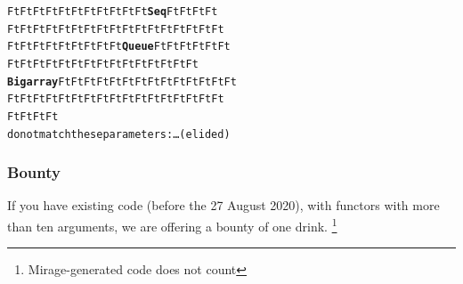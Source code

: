 \documentclass[11pt,aspectratio=169]{beamer}
\begin{document}
\begin{frame}[fragile]
\begin{alltt}
  {\color{green}{}Ft} {\color{green}{}Ft} {\color{green}{}Ft} {\color{green}{}Ft} {\color{green}{}Ft} {\color{green}{}Ft} {\color{green}{}Ft} {\color{green}{}Ft} {\color{green}{}Ft} {\color{green}{}Ft} {\color{green}{}Ft} {\color{red}{}\bfseries{}Seq} {\color{green}{}Ft} {\color{green}{}Ft} {\color{green}{}Ft} {\color{green}{}Ft}
  {\color{green}{}Ft} {\color{green}{}Ft} {\color{green}{}Ft} {\color{green}{}Ft} {\color{green}{}Ft} {\color{green}{}Ft} {\color{green}{}Ft} {\color{green}{}Ft} {\color{green}{}Ft} {\color{green}{}Ft} {\color{green}{}Ft} {\color{green}{}Ft} {\color{green}{}Ft} {\color{green}{}Ft} {\color{green}{}Ft} {\color{green}{}Ft} {\color{green}{}Ft}
  {\color{green}{}Ft} {\color{green}{}Ft} {\color{green}{}Ft} {\color{green}{}Ft} {\color{green}{}Ft} {\color{green}{}Ft} {\color{green}{}Ft} {\color{green}{}Ft} {\color{green}{}Ft} {\color{red}{}\bfseries{}Queue} {\color{green}{}Ft} {\color{green}{}Ft} {\color{green}{}Ft} {\color{green}{}Ft} {\color{green}{}Ft} {\color{green}{}Ft}
  {\color{green}{}Ft} {\color{green}{}Ft} {\color{green}{}Ft} {\color{green}{}Ft} {\color{green}{}Ft} {\color{green}{}Ft} {\color{green}{}Ft} {\color{green}{}Ft} {\color{green}{}Ft} {\color{green}{}Ft} {\color{green}{}Ft} {\color{green}{}Ft} {\color{green}{}Ft} {\color{green}{}Ft} {\color{green}{}Ft}
  {\color{red}{}\bfseries{}Bigarray} {\color{green}{}Ft} {\color{green}{}Ft} {\color{green}{}Ft} {\color{green}{}Ft} {\color{green}{}Ft} {\color{green}{}Ft} {\color{green}{}Ft} {\color{green}{}Ft} {\color{green}{}Ft} {\color{green}{}Ft} {\color{green}{}Ft} {\color{green}{}Ft} {\color{green}{}Ft} {\color{green}{}Ft}
  {\color{green}{}Ft} {\color{green}{}Ft} {\color{green}{}Ft} {\color{green}{}Ft} {\color{green}{}Ft} {\color{green}{}Ft} {\color{green}{}Ft} {\color{green}{}Ft} {\color{green}{}Ft} {\color{green}{}Ft} {\color{green}{}Ft} {\color{green}{}Ft} {\color{green}{}Ft} {\color{green}{}Ft} {\color{green}{}Ft} {\color{green}{}Ft} {\color{green}{}Ft}
  {\color{green}{}Ft} {\color{green}{}Ft} {\color{green}{}Ft} {\color{green}{}Ft}
do not match these parameters: \dots(elided)
\end{alltt}

\end{frame}

\begin{frame}\frametitle{Bounty}
  If you have existing code (before the 27 August 2020), with functors with more
  than ten arguments, we are offering a bounty of one drink.%
  \footnote{Mirage-generated code does not count}
\end{frame}
\end{document}
